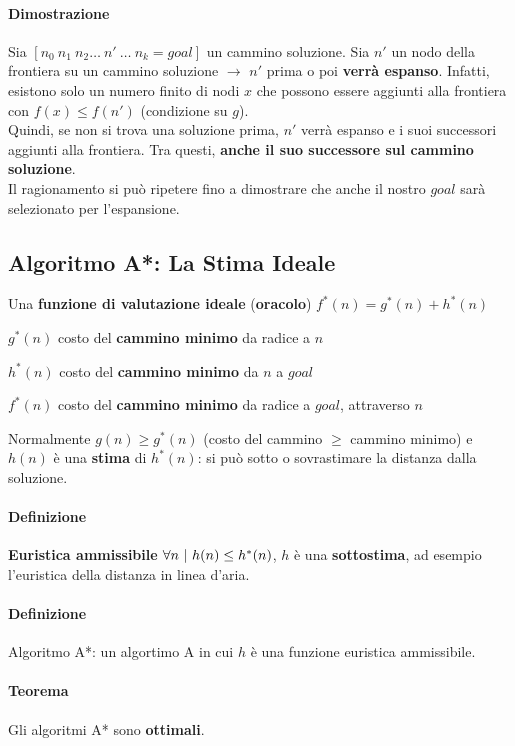 \documentclass[10pt]{book}
\begin{document}
\paragraph{Dimostrazione} Sia $[n_0\:n_1\:n_2 \ldots\:n'\:\ldots\:n_k = goal]$ un cammino soluzione. Sia $n'$ un nodo della frontiera su un cammino soluzione $\rightarrow$ $n'$ prima o poi \textbf{verrà espanso}. Infatti, esistono solo un numero finito di nodi $x$ che possono essere aggiunti alla frontiera con $f(x) \leq f(n')$ (condizione su $g$).\\
Quindi, se non si trova una soluzione prima, $n'$ verrà espanso e i suoi successori aggiunti alla frontiera. Tra questi, \textbf{anche il suo successore sul cammino soluzione}.\\
Il ragionamento si può ripetere fino a dimostrare che anche il nostro $goal$ sarà selezionato per l'espansione.
\subsection{Algoritmo A*: La Stima Ideale}
Una \textbf{funzione di valutazione ideale} (\textbf{oracolo}) $f^*(n) = g^*(n) + h^*(n)$
\begin{list}{}{}
	\item $g^*(n)$ costo del \textbf{cammino minimo} da radice a $n$
	\item $h^*(n)$ costo del \textbf{cammino minimo} da $n$ a $goal$
	\item $f^*(n)$ costo del \textbf{cammino minimo} da radice a $goal$, attraverso $n$
\end{list}
Normalmente $g(n) \geq g^*(n)$ (costo del cammino $\geq$ cammino minimo) e $h(n)$ è una \textbf{stima} di $h^*(n)$: si può sotto o sovrastimare la distanza dalla soluzione.
\paragraph{Definizione} \textbf{Euristica ammissibile} $\forall n \:\:\vline\:\:h(n) \leq h^*(n)$, $h$ è una \textbf{sottostima}, ad esempio l'euristica della distanza in linea d'aria.
\paragraph{Definizione} Algoritmo A*: un algortimo A in cui $h$ è una funzione euristica ammissibile.
\paragraph{Teorema} Gli algoritmi A* sono \textbf{ottimali}.
\end{document}
